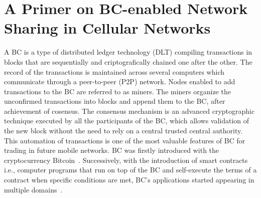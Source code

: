 \documentclass[journal]{IEEEtran}
\begin{document}


\section{A Primer on BC-enabled Network Sharing in Cellular Networks}
\label{section:related_work}

A BC is a type of distributed ledger technology (DLT) compiling transactions in blocks that are sequentially and criptografically chained one after the other. The record of the transactions is maintained across several computers which communicate through a peer-to-peer (P2P) network. Nodes enabled to add transactions to the BC are referred to as miners. The miners organize the unconfirmed transactions into blocks and append them to the BC, after achievement of cosensus. The consensus mechanism is an advanced cryptographic technique executed by all the participants of the BC, which allows validation of the new block without the need to rely on a central trusted central authority. This automation of transactions is one of the most valuable features of BC for trading in future mobile networks. BC was firstly introduced with the cryptocurrency Bitcoin~\cite{nakamoto2019bitcoin}. Successively, with the introduction of smart contracts i.e., computer programs that run on top of the BC and self-execute the terms of a contract when specific conditions are met, BC's applications started appearing in multiple domains~\cite{cai2018decentralized}.
\end{document}
